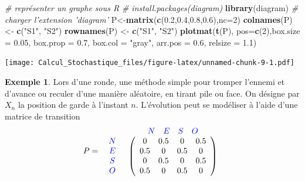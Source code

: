 \documentclass[
]{book}
\newenvironment{Shaded}{\begin{snugshade}}{\end{snugshade}}
\newcommand{\CommentTok}[1]{\textcolor[rgb]{0.56,0.35,0.01}{\textit{#1}}}
\newcommand{\DataTypeTok}[1]{\textcolor[rgb]{0.13,0.29,0.53}{#1}}
\newcommand{\DecValTok}[1]{\textcolor[rgb]{0.00,0.00,0.81}{#1}}
\newcommand{\FloatTok}[1]{\textcolor[rgb]{0.00,0.00,0.81}{#1}}
\newcommand{\KeywordTok}[1]{\textcolor[rgb]{0.13,0.29,0.53}{\textbf{#1}}}
\newcommand{\NormalTok}[1]{#1}
\newcommand{\StringTok}[1]{\textcolor[rgb]{0.31,0.60,0.02}{#1}}
\theoremstyle{definition}
\theoremstyle{definition}
\newtheorem{example}{Exemple}[chapter]
\theoremstyle{definition}
\theoremstyle{remark}
\begin{document}
\begin{Shaded}
\begin{Highlighting}[]
\CommentTok{# représenter un graphe sous R}
\CommentTok{# install.packages(diagram)}
\KeywordTok{library}\NormalTok{(diagram) }\CommentTok{# charger l'extension 'diagram'}
\NormalTok{P<-}\KeywordTok{matrix}\NormalTok{(}\KeywordTok{c}\NormalTok{(}\FloatTok{0.2}\NormalTok{,}\FloatTok{0.4}\NormalTok{,}\FloatTok{0.8}\NormalTok{,}\FloatTok{0.6}\NormalTok{),}\DataTypeTok{nc=}\DecValTok{2}\NormalTok{)}
\KeywordTok{colnames}\NormalTok{(P) <-}\StringTok{ }\KeywordTok{c}\NormalTok{(}\StringTok{"S1"}\NormalTok{, }\StringTok{"S2"}\NormalTok{)}
\KeywordTok{rownames}\NormalTok{(P) <-}\StringTok{ }\KeywordTok{c}\NormalTok{(}\StringTok{"S1"}\NormalTok{, }\StringTok{"S2"}\NormalTok{)}
\KeywordTok{plotmat}\NormalTok{(}\KeywordTok{t}\NormalTok{(P), }\DataTypeTok{pos=}\KeywordTok{c}\NormalTok{(}\DecValTok{2}\NormalTok{),}\DataTypeTok{box.size =} \FloatTok{0.05}\NormalTok{, }\DataTypeTok{box.prop =} \FloatTok{0.7}\NormalTok{, }
      \DataTypeTok{box.col =} \StringTok{"gray"}\NormalTok{, }\DataTypeTok{arr.pos =} \FloatTok{0.6}\NormalTok{, }\DataTypeTok{relsize =} \FloatTok{1.1}\NormalTok{)}
\end{Highlighting}
\end{Shaded}

\texttt{[image: Calcul\_Stochastique\_files/figure-latex/unnamed-chunk-9-1.pdf]}

\begin{example}
\protect\hypertarget{exm:unnamed-chunk-10}{}{\label{exm:unnamed-chunk-10} }Lors d'une ronde, une méthode simple pour tromper l'ennemi et d'avance ou reculer d'une manière aléatoire, en tirant pile ou face. On désigne par \(X_n\) la position de garde à l'instant \(n\). L'évolution peut se modéliser à l'aide d'une matrice de transition
\[
 P=\begin{array}{c c} &
\begin{array}{c c c c} \color{blue}{N} & \color{blue}{E} & \color{blue}{S} & \color{blue}{O} \\
\end{array}
\\
\begin{array}{c c c c}
\color{blue}{N} \\
\color{blue}{E}\\
\color{blue}{S} \\
\color{blue}{O}
\end{array}
&
\left(
\begin{array}{c c c c}
0 & 0.5 & 0 & 0.5 \\
0.5 & 0 & 0.5 & 0 \\
0 & 0.5 & 0 & 0.5 \\
0.5 & 0 & 0.5 & 0
\end{array}
\right)
\end{array}\]
\end{example}
\end{document}
